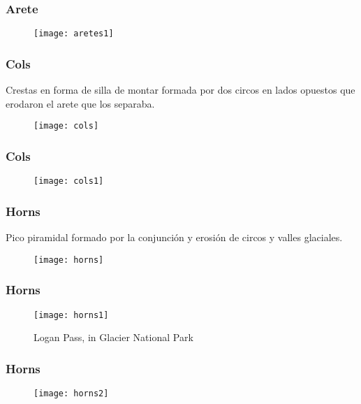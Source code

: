 \documentclass{beamer}
\begin{document}
\begin{frame}
\frametitle{Arete}
\begin{figure}
\begin{center}
\texttt{[image: aretes1]}
\end{center}
\end{figure}
\end{frame}
\begin{frame}
\frametitle{Cols}
\small{Crestas en forma de silla de montar formada por dos circos en lados opuestos que erodaron el arete que los separaba.}
\begin{figure}
\begin{center}
\texttt{[image: cols]}
\end{center}
\end{figure}
\end{frame}
\begin{frame}
\frametitle{Cols}
\begin{figure}
\begin{center}
\texttt{[image: cols1]}
\end{center}
\end{figure}
\end{frame}
\begin{frame}
\frametitle{Horns}
\small{Pico piramidal formado por la conjunción y erosión de circos y valles glaciales. }
\begin{figure}
\begin{center}
\texttt{[image: horns]}
\end{center}
\end{figure}
\end{frame}
\begin{frame}
\frametitle{Horns}
\begin{figure}
\begin{center}
\texttt{[image: horns1]}
\end{center}
\caption{Logan Pass, in Glacier National Park}
\end{figure}
\end{frame}
\begin{frame}
\frametitle{Horns}
\begin{figure}
\begin{center}
\texttt{[image: horns2]}
\end{center}
\end{figure}
\end{frame}
\end{document}
